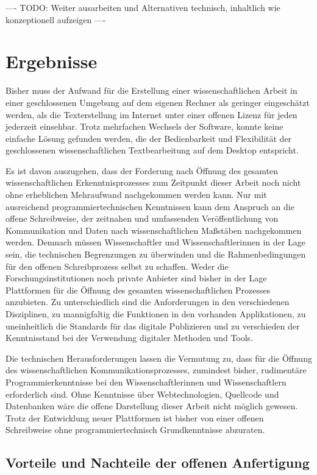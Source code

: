 ---- TODO: Weiter ausarbeiten und Alternativen technisch, inhaltlich wie konzeptionell aufzeigen ----

\section{Ergebnisse}

Bisher muss der Aufwand für die Erstellung einer wissenschaftlichen Arbeit in einer geschlossenen Umgebung auf dem eigenen Rechner als geringer eingeschätzt werden, als die Texterstellung im Internet unter einer offenen Lizenz für jeden jederzeit einsehbar. Trotz mehrfachen Wechsels der Software, konnte keine einfache Lösung gefunden werden, die der Bedienbarkeit und Flexibilität der geschlossenen wissenschaftlichen Textbearbeitung auf dem Desktop entspricht.

Es ist davon auszugehen, dass der Forderung nach Öffnung des gesamten wissenschaftlichen Erkenntnisprozesses zum Zeitpunkt dieser Arbeit noch nicht ohne erheblichen Mehraufwand nachgekommen werden kann. Nur mit ausreichend programmiertechnischen Kenntnissen kann dem Anspruch an die offene Schreibweise, der zeitnahen und umfassenden Veröffentlichung von Kommunikation und Daten nach wissenschaftlichen Maßstäben nachgekommen werden. Demnach müssen Wissenschaftler und Wissenschaftlerinnen in der Lage sein, die technischen Begrenzungen zu überwinden und die Rahmenbedingungen für den offenen Schreibprozess selbst zu schaffen. Weder die Forschungsinstitutionen noch private Anbieter sind bisher in der Lage Plattformen für die Öffnung des gesamten wissenschaftlichen Prozesses anzubieten. Zu unterschiedlich sind die Anforderungen in den verschiedenen Disziplinen, zu mannigfaltig die Funktionen in den vorhanden Applikationen, zu uneinheitlich die Standards für das digitale Publizieren und zu verschieden der Kenntnisstand bei der Verwendung digitaler Methoden und Tools.

Die technischen Herausforderungen lassen die Vermutung zu, dass für die Öffnung des wissenschaftlichen Kommunikationsprozesses, zumindest bisher, rudimentäre Programmierkenntnisse bei den Wissenschaftlerinnen und Wissenschaftlern erforderlich sind. Ohne Kenntnisse über Webtechnologien, Quellcode und Datenbanken wäre die offene Darstellung dieser Arbeit nicht möglich gewesen. Trotz der Entwicklung neuer Plattformen ist bisher von einer offenen Schreibweise ohne programmiertechnisch Grundkenntnisse abzuraten.

\subsection{Vorteile und Nachteile der offenen Anfertigung}

